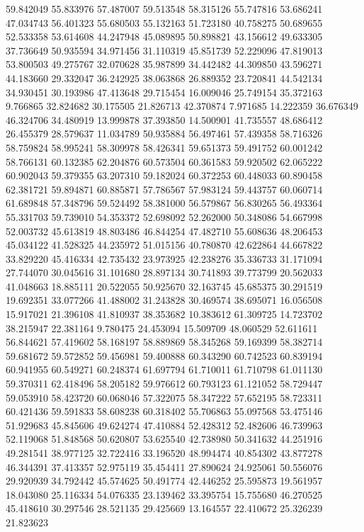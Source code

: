 59.842049
55.833976
57.487007
59.513548
58.315126
55.747816
53.686241
47.034743
56.401323
55.680503
55.132163
51.723180
40.758275
50.689655
52.533358
53.614608
44.247948
45.089895
50.898821
43.156612
49.633305
37.736649
50.935594
34.971456
31.110319
45.851739
52.229096
47.819013
53.800503
49.275767
32.070628
35.987899
34.442482
44.309850
43.596271
44.183660
29.332047
36.242925
38.063868
26.889352
23.720841
44.542134
34.930451
30.193986
47.413648
29.715454
16.009046
25.749154
35.372163
9.766865
32.824682
30.175505
21.826713
42.370874
7.971685
14.222359
36.676349
46.324706
34.480919
13.999878
37.393850
14.500901
41.735557
48.686412
26.455379
28.579637
11.034789
50.935884
56.497461
57.439358
58.716326
58.759824
58.995241
58.309978
58.426341
59.651373
59.491752
60.001242
58.766131
60.132385
62.204876
60.573504
60.361583
59.920502
62.065222
60.902043
59.379355
63.207310
59.182024
60.372253
60.448033
60.890458
62.381721
59.894871
60.885871
57.786567
57.983124
59.443757
60.060714
61.689848
57.348796
59.524492
58.381000
56.579867
56.830265
56.493364
55.331703
59.739010
54.353372
52.698092
52.262000
50.348086
54.667998
52.003732
45.613819
48.803486
46.844254
47.482710
55.608636
48.206453
45.034122
41.528325
44.235972
51.015156
40.780870
42.622864
44.667822
33.829220
45.416334
42.735432
23.973925
42.238276
35.336733
31.171094
27.744070
30.045616
31.101680
28.897134
30.741893
39.773799
20.562033
41.048663
18.885111
20.522055
50.925670
32.163745
45.685375
30.291519
19.692351
33.077266
41.488002
31.243828
30.469574
38.695071
16.056508
15.917021
21.396108
41.810937
38.353682
10.383612
61.309725
14.723702
38.215947
22.381164
9.780475
24.453094
15.509709
48.060529
52.611611
56.844621
57.419602
58.168197
58.889869
58.345268
59.169399
58.382714
59.681672
59.572852
59.456981
59.400888
60.343290
60.742523
60.839194
60.941955
60.549271
60.248374
61.697794
61.710011
61.710798
61.011130
59.370311
62.418496
58.205182
59.976612
60.793123
61.121052
58.729447
59.053910
58.423720
60.068046
57.322075
58.347222
57.652195
58.723311
60.421436
59.591833
58.608238
60.318402
55.706863
55.097568
53.475146
51.929683
45.845606
49.624274
47.410884
52.428312
52.482606
46.739963
52.119068
51.848568
50.620807
53.625540
42.738980
50.341632
44.251916
49.281541
38.977125
32.722416
33.196520
48.994474
40.854302
43.877278
46.344391
37.413357
52.975119
35.454411
27.890624
24.925061
50.556076
29.920939
34.792442
45.574625
50.491774
42.446252
25.595873
19.561957
18.043080
25.116334
54.076335
23.139462
33.395754
15.755680
46.270525
45.418610
30.297546
28.521135
29.425669
13.164557
22.410672
25.326239
21.823623
